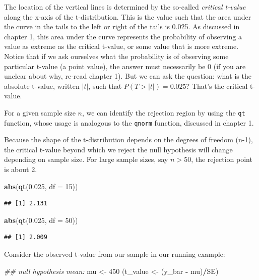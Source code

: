 \documentclass[12pt,]{krantz}
\newenvironment{Shaded}{\begin{snugshade}}{\end{snugshade}}
\newcommand{\CommentTok}[1]{\textcolor[rgb]{0.56,0.35,0.01}{\textit{#1}}}
\newcommand{\DataTypeTok}[1]{\textcolor[rgb]{0.13,0.29,0.53}{#1}}
\newcommand{\DecValTok}[1]{\textcolor[rgb]{0.00,0.00,0.81}{#1}}
\newcommand{\FloatTok}[1]{\textcolor[rgb]{0.00,0.00,0.81}{#1}}
\newcommand{\KeywordTok}[1]{\textcolor[rgb]{0.13,0.29,0.53}{\textbf{#1}}}
\newcommand{\NormalTok}[1]{#1}
\newcommand{\OperatorTok}[1]{\textcolor[rgb]{0.81,0.36,0.00}{\textbf{#1}}}
\newcommand{\StringTok}[1]{\textcolor[rgb]{0.31,0.60,0.02}{#1}}
\begin{document}
The location of the vertical lines is determined by the so-called \emph{critical t-value} along the x-axis of the t-distribution. This is the value such that the area under the curve in the tails to the left or right of the tails is 0.025. As discussed in chapter 1, this area under the curve represents the probability of observing a value as extreme as the critical t-value, or some value that is more extreme. Notice that if we ask ourselves what the probability is of observing some particular t-value (a point value), the answer must necessarily be \(0\) (if you are unclear about why, re-read chapter 1). But we can ask the question: what is the absolute t-value, written \(|t|\), such that \(P(T>|t|)=0.025\)? That's the critical t-value.

For a given sample size \(n\), we can identify the rejection region by using the \texttt{qt} function, whose usage is analogous to the \texttt{qnorm} function, discussed in chapter 1.

Because the shape of the t-distribution depends on the degrees of freedom (n-1), the critical t-value beyond which we reject the null hypothesis will change depending on sample size. For large sample sizes, say \(n>50\), the rejection point is about 2.

\begin{Shaded}
\begin{Highlighting}[]
\KeywordTok{abs}\NormalTok{(}\KeywordTok{qt}\NormalTok{(}\FloatTok{0.025}\NormalTok{, }\DataTypeTok{df =} \DecValTok{15}\NormalTok{))}
\end{Highlighting}
\end{Shaded}

\begin{verbatim}
## [1] 2.131
\end{verbatim}

\begin{Shaded}
\begin{Highlighting}[]
\KeywordTok{abs}\NormalTok{(}\KeywordTok{qt}\NormalTok{(}\FloatTok{0.025}\NormalTok{, }\DataTypeTok{df =} \DecValTok{50}\NormalTok{))}
\end{Highlighting}
\end{Shaded}

\begin{verbatim}
## [1] 2.009
\end{verbatim}

Consider the observed t-value from our sample in our running example:

\begin{Shaded}
\begin{Highlighting}[]
\CommentTok{## null hypothesis mean:}
\NormalTok{mu <-}\StringTok{ }\DecValTok{450}
\NormalTok{(t_value <-}\StringTok{ }\NormalTok{(y_bar }\OperatorTok{-}\StringTok{ }\NormalTok{mu)}\OperatorTok{/}\NormalTok{SE)}
\end{Highlighting}
\end{Shaded}
\end{document}
